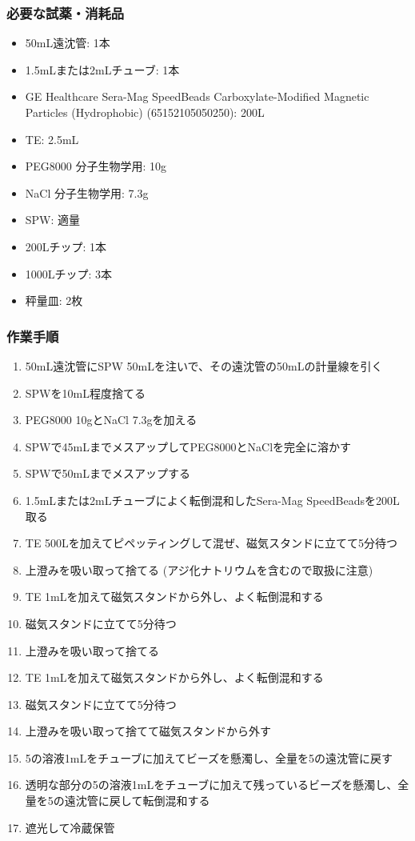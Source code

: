 \documentclass[titlepage,10pt,a4paper]{jsbook}
\begin{document}
\subsubsection{必要な試薬・消耗品}
\begin{itemize}
\item 50mL遠沈管: 1本
\item 1.5mLまたは2mLチューブ: 1本
\item GE Healthcare Sera-Mag SpeedBeads Carboxylate-Modified Magnetic Particles (Hydrophobic) (65152105050250): 200{\textmu}L
\item TE: 2.5mL
\item PEG8000 分子生物学用: 10g
\item NaCl 分子生物学用: 7.3g
\item SPW: 適量
\item 200{\textmu}Lチップ: 1本
\item 1000{\textmu}Lチップ: 3本
\item 秤量皿: 2枚
\end{itemize}

\subsubsection{作業手順}
\begin{enumerate}
\item 50mL遠沈管にSPW 50mLを注いで、その遠沈管の50mLの計量線を引く
\item SPWを10mL程度捨てる
\item PEG8000 10gとNaCl 7.3gを加える
\item SPWで45mLまでメスアップしてPEG8000とNaClを完全に溶かす
\item SPWで50mLまでメスアップする
\item 1.5mLまたは2mLチューブによく転倒混和したSera-Mag SpeedBeadsを200{\textmu}L取る
\item TE 500{\textmu}Lを加えてピペッティングして混ぜ、磁気スタンドに立てて5分待つ
\item 上澄みを吸い取って捨てる (アジ化ナトリウムを含むので取扱に注意)
\item TE 1mLを加えて磁気スタンドから外し、よく転倒混和する
\item 磁気スタンドに立てて5分待つ
\item 上澄みを吸い取って捨てる
\item TE 1mLを加えて磁気スタンドから外し、よく転倒混和する
\item 磁気スタンドに立てて5分待つ
\item 上澄みを吸い取って捨てて磁気スタンドから外す
\item 5の溶液1mLをチューブに加えてビーズを懸濁し、全量を5の遠沈管に戻す
\item 透明な部分の5の溶液1mLをチューブに加えて残っているビーズを懸濁し、全量を5の遠沈管に戻して転倒混和する
\item 遮光して冷蔵保管
\end{enumerate}
\end{document}
